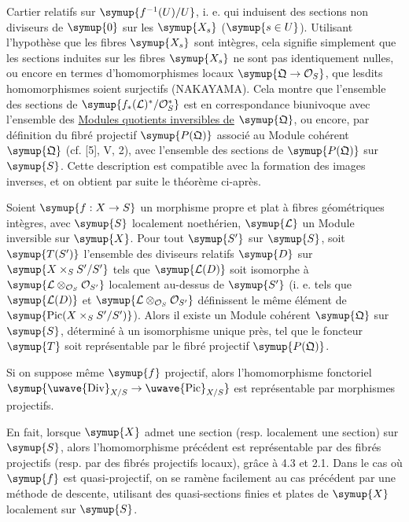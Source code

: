 Cartier relatifs sur $\symup{f^{-1}(U)/U}$, i. e. qui induisent des sections non
diviseurs de $\symup{0}$ sur les $\symup{X_s}$ ($\symup{s\in U}$). Utilisant l'hypothèse que les
fibres $\symup{X_s}$ sont intègres, cela signifie simplement que les sections induites
sur les fibres $\symup{X_s}$ ne sont pas identiquement nulles, ou encore en termes
d'homomorphismes locaux $\symup{\mathfrak Q\to\mathcal O_S}$, que lesdits
homomorphismes soient surjectifs (NAKAYAMA). Cela montre que l'ensemble des
sections de $\symup{f_*(\mathcal L)^*/\mathcal O_S^*}$ est en correspondance
biunivoque avec l'ensemble des \uline{Modules quotients inversibles de} $\symup{\mathfrak Q}$,
ou encore, par définition du fibré projectif $\symup{P(\mathfrak Q)}$ associé au
Module cohérent $\symup{\mathfrak Q}$ (cf. [5], V, 2), avec l'ensemble des sections de
$\symup{P(\mathfrak Q)}$ sur $\symup{S}$. Cette description est compatible avec la
formation des images inverses, et on obtient par suite le théorème ci-après.

 Soient $\symup{f:X\to S}$ un morphisme propre et
plat à fibres géométriques intègres, avec $\symup{S}$ localement noethérien,
$\symup{\mathcal L}$ un Module inversible sur $\symup{X}$. Pour tout $\symup{S'}$ sur $\symup{S}$, soit
$\symup{T(S')}$ l'ensemble des diviseurs relatifs $\symup{D}$ sur $\symup{X\times_SS'/S'}$ tels que
$\symup{\mathcal L(D)}$ soit isomorphe à
$\symup{\mathcal L\otimes_{\mathcal O_S}\mathcal O_{S'}}$ localement au-dessus de $\symup{S'}$
(i. e. tels que $\symup{\mathcal L(D)}$ et
$\symup{\mathcal L\otimes_{\mathcal O_S}\mathcal O_{S'}}$ définissent le même élément
de $\symup{\operatorname{Pic}(X\times_SS'/S')}$). Alors il existe un Module cohérent
$\symup{\mathfrak Q}$ sur $\symup{S}$, déterminé à un isomorphisme unique près, tel que le
foncteur $\symup{T}$ soit représentable par le fibré projectif $\symup{P(\mathfrak Q)}$.

 Si on suppose même $\symup{f}$ projectif, alors
l'homomorphisme fonctoriel
$\symup{\text{\uwave{Div}}_{X/S}\to\text{\uwave{Pic}}_{X/S}}$ est
représentable par morphismes projectifs.

En fait, lorsque $\symup{X}$ admet une section (resp. localement une section) sur $\symup{S}$,
alors l'homomorphisme précédent est représentable par des fibrés projectifs
(resp. par des fibrés projectifs locaux), grâce à 4.3 et 2.1. Dans le cas où
$\symup{f}$ est quasi-projectif, on se ramène facilement au cas précédent par une
méthode de descente, utilisant des quasi-sections finies et plates de $\symup{X}$
localement sur $\symup{S}$.

